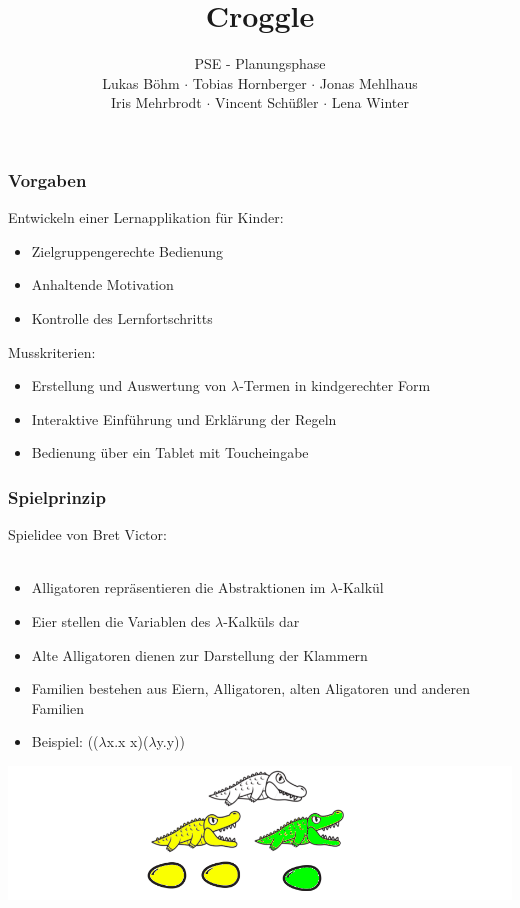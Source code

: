 \documentclass[t]{beamer}
\title{Croggle}
\subtitle{PSE - Planungsphase \\[0.3cm]
Lukas Böhm $\cdot$ Tobias Hornberger $\cdot$ Jonas Mehlhaus \\ Iris Mehrbrodt  $\cdot$ Vincent Schüßler $\cdot$ Lena Winter}
\institute[IPD]{Institut für Programmstruktutren und Datenorganisation}
\begin{document}
\begin{frame}
        \maketitle
\end{frame}

\begin{frame}
	\frametitle{Vorgaben}
	Entwickeln einer Lernapplikation für Kinder:\\
	\begin{itemize}
		\item Zielgruppengerechte Bedienung
		\item Anhaltende Motivation
		\item Kontrolle des Lernfortschritts
	\end{itemize}


	Musskriterien:\\
	\begin{itemize}
		\item Erstellung und Auswertung von \(\lambda\)-Termen in kindgerechter Form
		\item Interaktive Einführung und Erklärung der Regeln
		\item Bedienung über ein Tablet mit Toucheingabe
	\end{itemize}
\end{frame}

\begin{frame}
	\frametitle{Spielprinzip}
	Spielidee von Bret Victor: \\
     \\
	\begin{itemize}
		\item Alligatoren repräsentieren die Abstraktionen im \(\lambda\)-Kalkül
		\item Eier stellen die Variablen des \(\lambda\)-Kalküls dar
		\item Alte Alligatoren dienen zur Darstellung der Klammern
		\item Familien bestehen aus Eiern, Alligatoren, alten Aligatoren und anderen Familien 
		\item Beispiel: ((\(\lambda\)x.x x)(\(\lambda\)y.y))
	\end{itemize}
	\includegraphics[width=\textwidth]{Spielelemente.png}
\end{frame}
\end{document}
